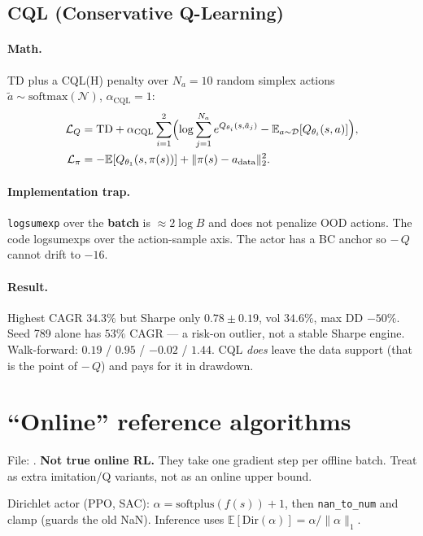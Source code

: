 \documentclass[11pt]{article}
\begin{document}
\subsection{CQL (Conservative Q-Learning)}

\paragraph{Math.}
TD plus a CQL(H) penalty over $N_a=10$ random simplex actions
$\tilde a\sim\mathrm{softmax}(\mathcal{N})$, $\alpha_{\mathrm{CQL}}=1$:
\begin{align}
\mathcal{L}_Q &= \mathrm{TD}
+\alpha_{\mathrm{CQL}}\sum_{i=1}^2\Bigl(
\log\sum_{j=1}^{N_a}e^{Q_{\theta_i}(s,\tilde a_j)}
-\mathbb{E}_{a\sim\mathcal{D}}[Q_{\theta_i}(s,a)]\Bigr), \\
\mathcal{L}_\pi &= -\mathbb{E}[Q_{\theta_1}(s,\pi(s))]
+\|\pi(s)-a_{\mathrm{data}}\|_2^2.
\end{align}

\paragraph{Implementation trap.}
\texttt{logsumexp} over the \textbf{batch} is $\approx 2\log B$ and does not
penalize OOD actions. The code logsumexps over the action-sample axis.
The actor has a BC anchor so $-\,Q$ cannot drift to $-16$.

\paragraph{Result.}
Highest CAGR $34.3\%$ but Sharpe only $0.78\pm 0.19$, vol $34.6\%$,
max DD $-50\%$.
Seed 789 alone has $53\%$ CAGR --- a risk-on outlier, not a stable Sharpe engine.
Walk-forward: $0.19$ / $0.95$ / $-0.02$ / $1.44$.
CQL \emph{does} leave the data support (that is the point of $-\,Q$) and pays
for it in drawdown.

\section{``Online'' reference algorithms}
\label{sec:online}

File: .
\textbf{Not true online RL.} They take one gradient step per offline batch.
Treat as extra imitation/Q variants, not as an online upper bound.

Dirichlet actor (PPO, SAC): $\alpha=\mathrm{softplus}(f(s))+1$, then
\texttt{nan\_to\_num} and clamp (guards the old NaN).
Inference uses $\mathbb{E}[\mathrm{Dir}(\alpha)]=\alpha/\|\alpha\|_1$.
\end{document}
